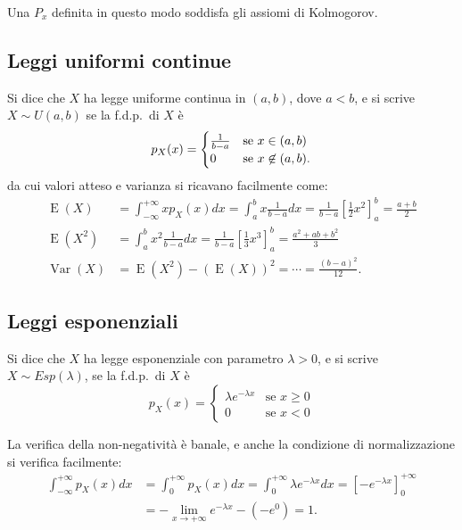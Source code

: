 \documentclass[11pt,a4paper,twoside]{article}
\let\geq\geqslant%
\DeclareMathOperator{\Var}{Var}
\DeclareMathOperator{\E}{E}
\begin{document}
Una \(P_x\) definita in questo modo soddisfa gli assiomi di
Kolmogorov.


\subsection{Leggi uniformi continue}
Si dice che \(X\) ha legge uniforme continua in \((a,b)\), dove
\(a<b\), e si scrive \(X\sim U(a,b)\) se la f.d.p.\ di \(X\) è
\[
  p_X(x) = \begin{cases}
    1\over{b-a} & \mbox{se } x\in (a,b) \\
    0 & \mbox{se } x\not\in (a,b) .
  \end{cases}
\]
da cui valori atteso e varianza si ricavano facilmente come:
\begingroup
\addtolength{\jot}{1em}
\begin{align*}
  \E(X) &= \int_{-\infty}^{+\infty} xp_X(x) dx = \int_a^b x
          \frac{1}{b-a} dx = \frac{1}{b-a}\left[ \frac{1}{2}x^2 \right]_a^b =
          \frac{a+b}{2} \\
  \E(X^2) &= \int_a^b x^2 \frac{1}{b-a}dx = \frac{1}{b-a}\left[
            \frac{1}{3}x^3 \right]_a^b = \frac{a^2 + ab + b^2}{3} \\
  \Var(X) &= \E(X^2) - {(\E(X))}^2 = \cdots = \frac{{(b-a)}^2}{12}.
\end{align*}
\endgroup

\subsection{Leggi esponenziali}
Si dice che \(X\) ha legge esponenziale con parametro \(\lambda > 0\),
e si scrive \(X\sim Esp(\lambda)\), se la f.d.p.\ di \(X\) è
\[
  p_X(x) = \begin{cases}
    \lambda e^{-\lambda x} & \mbox{se } x \geq 0 \\
    0 & \mbox{se } x < 0
  \end{cases}
\]

La verifica della non-negatività è banale, e anche la condizione di
normalizzazione si verifica facilmente:
\begin{align*}
  \int_{-\infty}^{+\infty} p_X(x) dx &= \int_0^{+\infty} p_X(x) dx =
                                       \int_0^{+\infty} \lambda  e^{-\lambda x} dx =
                                       {\left[ -e^{-\lambda x} \right]}_0^{+\infty} \\
                                     & =- \lim_{x\to +\infty} e^{-\lambda x} - (-e^0) = 1.
\end{align*}
\end{document}
